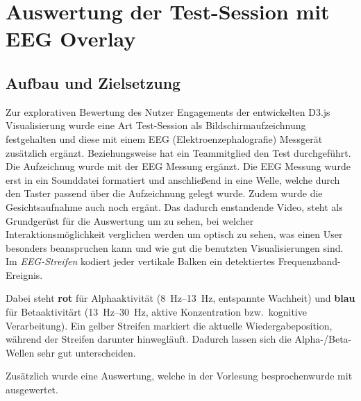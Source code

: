 \documentclass[11pt,a4paper]{article}
\begin{document}
\section{Auswertung der Test-Session mit EEG Overlay}\label{sec:eeg-session}

\subsection{Aufbau und Zielsetzung}\label{subsec:eeg-aufbau}
Zur explorativen Bewertung des Nutzer Engagements der entwickelten
D3.js Visualisierung wurde eine Art Test-Session als Bildschirmaufzeichnung
festgehalten und diese mit einem EEG (Elektroenzephalografie) Messgerät zusätzlich ergänzt.
Beziehungsweise hat ein Teammitglied den Test durchgeführt.
Die Aufzeichnug wurde mit der EEG Messung ergänzt. Die EEG Messung wurde erst in ein Sounddatei formatiert und
anschließend in eine Welle, welche durch den Taster passend über die Aufzeichnung gelegt wurde. Zudem wurde die Gesichtsaufnahme auch noch ergänt.
Das dadurch enstandende Video, steht als Grundgerüst für die Auswertung um zu sehen, bei welcher Interaktionsmöglichkeit verglichen werden um optisch zu sehen,
was einen User besonders beanspruchen kann und wie gut die benutzten Visualisierungen sind.
Im \textit{EEG-Streifen} kodiert jeder vertikale Balken ein detektiertes Frequenzband-Ereignis.

Dabei steht
\textcolor[HTML]{C0392B}{\textbf{rot}} für \mbox{Alphaaktivität}
(\SIrange{8}{13}{\hertz}, entspannte Wachheit) und
\textcolor[HTML]{2C6FBB}{\textbf{blau}} für \mbox{Betaaktivitärt}
(\SIrange{13}{30}{\hertz}, aktive Konzentration bzw.\ kognitive Verarbeitung).
Ein gelber Streifen markiert die aktuelle Wiedergabeposition, während der
Streifen darunter hinwegläuft. Dadurch lassen sich die Alpha-/Beta-Wellen sehr gut unterscheiden.

Zusätzlich wurde eine Auswertung, welche in der Vorlesung besprochenwurde mit ausgewertet.
\end{document}
